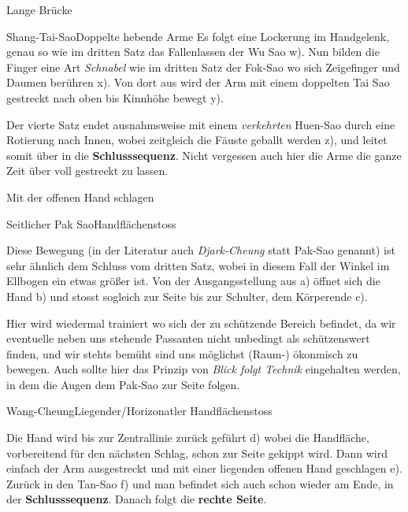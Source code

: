 \begin{WTSatz}{Lange Br\"ucke}
\begin{WTSatzTeil}{Shang-Tai-Sao}{Doppelte hebende Arme}
		Es folgt eine Lockerung im Handgelenk, genau so wie im dritten Satz das Fallenlassen der Wu Sao w). Nun bilden die Finger eine Art \textit{Schnabel} wie im dritten Satz der Fok-Sao wo sich Zeigefinger und Daumen ber\"uhren x). Von dort aus wird der Arm mit einem doppelten Tai Sao gestreckt nach oben bis Kinnh\"ohe bewegt y).
		
		Der vierte Satz endet ausnahmsweise mit einem \textit{verkehrten} Huen-Sao durch eine Rotierung nach Innen, wobei zeitgleich die F\"auste geballt werden z), und leitet somit \"uber in die \textbf{Schlusssequenz}. Nicht vergessen auch hier die Arme die ganze Zeit \"uber voll gestreckt zu lassen.
		
	\end{WTSatzTeil}
\end{WTSatz}


\begin{WTSatz}{Mit der offenen Hand schlagen}%

	
	\begin{WTSatzTeil}{Seitlicher Pak Sao}{Handfl\"achenstoss}

		Diese Bewegung (in der Literatur auch \textit{Djark-Cheung} statt Pak-Sao genannt) ist sehr \"ahnlich dem Schluss vom dritten Satz, wobei in diesem Fall der Winkel im Ellbogen ein etwas gr\"o{\ss}er ist. Von der Ausgangsstellung aus a) \"offnet sich die Hand b) und stosst sogleich zur Seite bis zur Schulter, dem K\"orperende c).
		
		Hier wird wiedermal trainiert wo sich der zu sch\"utzende Bereich befindet, da wir eventuelle neben uns stehende Passanten nicht unbedingt als sch\"utzenswert finden, und wir stehts bem\"uht sind uns m\"oglichst (Raum-) \"okonmisch zu bewegen. Auch sollte hier das Prinzip von \textit{Blick folgt Technik} eingehalten werden, in dem die Augen dem Pak-Sao zur Seite folgen.
		
		
	\end{WTSatzTeil}
	\begin{WTSatzTeil}{Wang-Cheung}{Liegender/Horizonatler Handfl\"achenstoss}
		
		Die Hand wird bis zur Zentrallinie zur\"uck gef\"uhrt d) wobei die Handfl\"ache, vorbereitend f\"ur den n\"achsten Schlag, schon zur Seite gekippt wird. Dann wird einfach der Arm ausgestreckt und mit einer liegenden offenen Hand geschlagen e). Zur\"uck in den Tan-Sao f) und man befindet sich auch schon wieder am Ende, in der \textbf{Schlusssequenz}. Danach folgt die \textbf{rechte Seite}.
		
	\end{WTSatzTeil}
\end{WTSatz}


